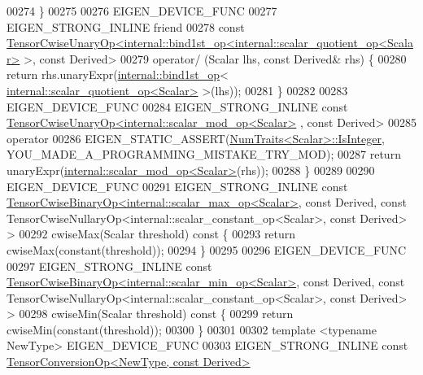 \begin{DoxyCode}
00274     \}
00275 
00276     EIGEN\_DEVICE\_FUNC
00277     EIGEN\_STRONG\_INLINE \textcolor{keyword}{friend}
00278     \textcolor{keyword}{const} 
      \hyperlink{class_eigen_1_1_tensor_cwise_unary_op}{TensorCwiseUnaryOp<internal::bind1st\_op<internal::scalar\_quotient\_op<Scalar>}
       >, \textcolor{keyword}{const} Derived>
00279     operator/ (Scalar lhs, \textcolor{keyword}{const} Derived& rhs) \{
00280       \textcolor{keywordflow}{return} rhs.unaryExpr(\hyperlink{struct_eigen_1_1internal_1_1bind1st__op}{internal::bind1st\_op}<
      \hyperlink{struct_eigen_1_1internal_1_1scalar__quotient__op}{internal::scalar\_quotient\_op<Scalar>} >(lhs));
00281     \}
00282 
00283     EIGEN\_DEVICE\_FUNC
00284     EIGEN\_STRONG\_INLINE \textcolor{keyword}{const} \hyperlink{class_eigen_1_1_tensor_cwise_unary_op}{TensorCwiseUnaryOp<internal::scalar\_mod\_op<Scalar>}
      , \textcolor{keyword}{const} Derived>
00285     operator%
00286       EIGEN\_STATIC\_ASSERT(\hyperlink{group___core___module_struct_eigen_1_1_num_traits}{NumTraits<Scalar>::IsInteger}, 
      YOU\_MADE\_A\_PROGRAMMING\_MISTAKE\_TRY\_MOD);
00287       \textcolor{keywordflow}{return} unaryExpr(\hyperlink{struct_eigen_1_1internal_1_1scalar__mod__op}{internal::scalar\_mod\_op<Scalar>}(rhs));
00288     \}
00289 
00290     EIGEN\_DEVICE\_FUNC
00291     EIGEN\_STRONG\_INLINE \textcolor{keyword}{const} 
      \hyperlink{class_eigen_1_1_tensor_cwise_binary_op}{TensorCwiseBinaryOp<internal::scalar\_max\_op<Scalar>}, \textcolor{keyword}{
      const} Derived, \textcolor{keyword}{const} TensorCwiseNullaryOp<internal::scalar\_constant\_op<Scalar>, \textcolor{keyword}{const} Derived> >
00292     cwiseMax(Scalar threshold)\textcolor{keyword}{ const }\{
00293       \textcolor{keywordflow}{return} cwiseMax(constant(threshold));
00294     \}
00295 
00296     EIGEN\_DEVICE\_FUNC
00297     EIGEN\_STRONG\_INLINE \textcolor{keyword}{const} 
      \hyperlink{class_eigen_1_1_tensor_cwise_binary_op}{TensorCwiseBinaryOp<internal::scalar\_min\_op<Scalar>}, \textcolor{keyword}{
      const} Derived, \textcolor{keyword}{const} TensorCwiseNullaryOp<internal::scalar\_constant\_op<Scalar>, \textcolor{keyword}{const} Derived> >
00298     cwiseMin(Scalar threshold)\textcolor{keyword}{ const }\{
00299       \textcolor{keywordflow}{return} cwiseMin(constant(threshold));
00300     \}
00301 
00302     \textcolor{keyword}{template} <\textcolor{keyword}{typename} NewType> EIGEN\_DEVICE\_FUNC
00303     EIGEN\_STRONG\_INLINE \textcolor{keyword}{const} \hyperlink{class_eigen_1_1_tensor_conversion_op}{TensorConversionOp<NewType, const Derived>}

\end{DoxyCode}
